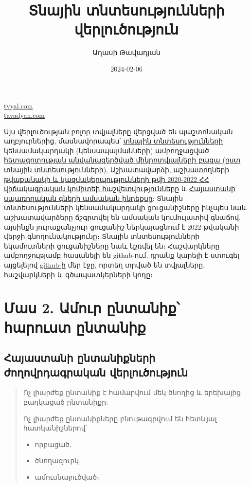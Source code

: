 \documentclass[
]{article}
\title{Տնային տնտեսությունների վերլուծություն}
\author{Աղասի Թավադյան}
\date{2024-02-06}
\providecommand{\tightlist}{%
  \setlength{\itemsep}{0pt}\setlength{\parskip}{0pt}}
\begin{document}
\maketitle

\href{https://www.tvyal.com/}{tvyal.com}\\
\href{https://www.tavadyan.com/}{tavadyan.com}

Այս վերլուծության բոլոր տվյալները վերցված են պաշտոնական աղբյուրներից,
մասնավորապես՝ \href{https://www.armstat.am/en/?nid=205}{տնային
տնտեսությունների կենսամակարդակի (կենսապայմանների) ամբողջացված
հետազոտության անվանազերծված միկրոտվյալների բազա (ըստ տնային
տնտեսությունների)},
\href{https://www.armstat.am/file/article/lab_market_2023_14.pdf}{Աշխատավարձի,
աշխատողների թվաքանակի և կազմակերպությունների թվի 2020-2022 ՀՀ
վիճակագրական կոմիտեի հաշվետվությունները} և
\href{https://www.cba.am/stat/stat_data_arm/6_CPI_arm.xls}{Հայաստանի
սպառողական գների ամսական ինդեքսը}: Տնային տնտեսությունների
կենսամակարդակի ցուցանիշները ինչպես նաև աշխատավարձերը ճշգրտվել են ամսական
կումուլատիվ գնաճով, այսինքն յուրաքանչյուր ցուցանիշ ներկայացնում է 2022
թվականի վերջի գնողունակությունը։ Տնային տնտեսությունների եկամուտների
ցուցանիշները նաև կշռվել են։ Հաշվարկները ամբողջությամբ հասանելի են
github-ում, դրանք կարելի է ստուգել այցելելով
\href{https://github.com/tavad/tvyal_newsletter/blob/main/2024/household_3_in_1.Rmd}{github-ի}
մեր էջը, որտեղ տրված են տվյալները, հաշվարկների և գծապատկերների կոդը։

\newpage

\section{Մաս 2. Ամուր ընտանիք՝ հարուստ
ընտանիք}\label{ux574ux561ux57d-2.-ux561ux574ux578ux582ux580-ux568ux576ux57fux561ux576ux56bux584-ux570ux561ux580ux578ux582ux57dux57f-ux568ux576ux57fux561ux576ux56bux584}

\subsection{Հայաստանի ընտանիքների ժողովրդագրական
վերլուծություն}\label{ux570ux561ux575ux561ux57dux57fux561ux576ux56b-ux568ux576ux57fux561ux576ux56bux584ux576ux565ux580ux56b-ux56aux578ux572ux578ux57eux580ux564ux561ux563ux580ux561ux56fux561ux576-ux57eux565ux580ux56cux578ux582ux56eux578ux582ux569ux575ux578ux582ux576}

\begin{quote}
Ոչ լիարժեք ընտանիք է համարվում մեկ ծնողից և երեխայից բաղկացած ընտանիքը:

Ոչ լիարժեք ընտանիքները բնութագրվում են հետևյալ հատկանիշներով՝

\begin{itemize}
\tightlist
\item
  որբացած,
\item
  ծնողազուրկ,
\item
  ամուսնալուծված։
\end{itemize}
\end{quote}
\end{document}
